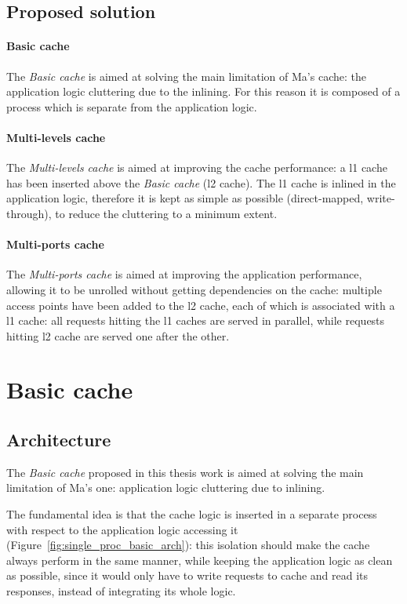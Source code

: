 \documentclass[11pt,a4paper,oneside]{memoir}
\begin{document}
\subsection{Proposed solution}
\paragraph{Basic cache}
The \emph{Basic cache} is aimed at solving the main limitation of Ma's cache:
the application logic cluttering due to the inlining.
For this reason it is composed of a process which is separate from the
application logic.

\paragraph{Multi-levels cache}
The \emph{Multi-levels cache} is aimed at improving the cache performance: a
\ac{l1} cache has been inserted above the \emph{Basic cache} (\ac{l2} cache).
The \ac{l1} cache is inlined in the application logic, therefore it is kept as
simple as possible (direct-mapped, write-through), to reduce the cluttering to
a minimum extent.

\paragraph{Multi-ports cache}
The \emph{Multi-ports cache} is aimed at improving the application performance,
allowing it to be unrolled without getting dependencies on the cache: multiple
access points have been added to the \ac{l2} cache, each of which is associated
with a \ac{l1} cache: all requests hitting the \ac{l1} caches are served in
parallel, while requests hitting \ac{l2} cache are served one after the other.

\section{Basic cache}
\subsection{Architecture}
The \emph{Basic cache} proposed in this thesis work is aimed at solving the
main limitation of Ma's one: application logic cluttering due to inlining.

The fundamental idea is that the cache logic is inserted in a separate process
with respect to the application logic accessing it
(Figure~\ref{fig:single_proc_basic_arch}): this isolation should make the cache
always perform in the same manner, while keeping the application logic as clean
as possible, since it would only have to write requests to cache and read its
responses, instead of integrating its whole logic.
\end{document}
